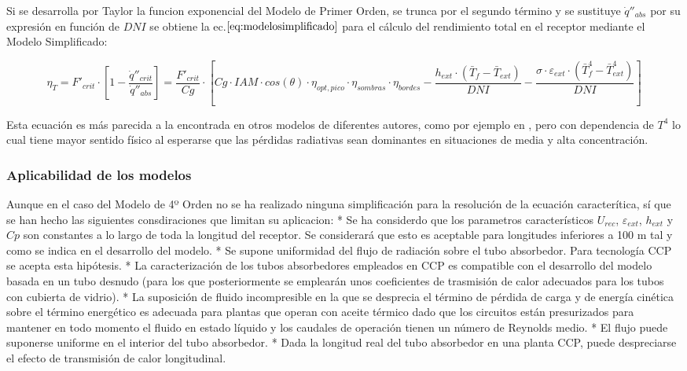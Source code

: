 Si se desarrolla por Taylor la funcion exponencial del Modelo de Primer
Orden, se trunca por el segundo término y se sustituye
\(\dot q''_{abs}\) por su expresión en función de \(DNI\) se obtiene la
ec.\(\eqref{eq:modelosimplificado}\) para el cálculo del rendimiento
total en el receptor mediante el Modelo Simplificado:

\begin{equation}
    \eta_{T} = F'_{crit} \cdot \left[1 - \frac{\dot q''_{crit}}{\dot q''_{abs}}\right] = \frac{F'_{crit}}{Cg} \cdot \left[Cg \cdot IAM \cdot cos(\theta) \cdot \eta_{opt,pico} \cdot \eta_{sombras} \cdot \eta_{bordes} - \frac{h_{ext}\cdot (\bar{T}_{f}-\bar{T}_{ext})}{DNI} - \frac{\sigma \cdot \varepsilon_{ext}\cdot(\bar{T}^{4}_{f}-\bar{T}^{4}_{ext})}{DNI}\right] 
    \label{eq:modelosimplificado}
\end{equation}

Esta ecuación es más parecida a la encontrada en otros modelos de
diferentes autores, como por ejemplo en
\cite{1022085/DVRL97SH}\cite{1022085/HI2ETXYA}, pero con dependencia de
\(T^{4}\) lo cual tiene mayor sentido físico al esperarse que las
pérdidas radiativas sean dominantes en situaciones de media y alta
concentración.

\hypertarget{aplicabilidad-de-los-modelos}{%
\subsubsection{Aplicabilidad de los
modelos}\label{aplicabilidad-de-los-modelos}}

Aunque en el caso del Modelo de 4º Orden no se ha realizado ninguna
simplificación para la resolución de la ecuación caracterítica, sí que
se han hecho las siguientes consdiraciones que limitan su aplicacion: *
Se ha considerdo que los parametros característicos \(U_{rec}\),
\(\varepsilon_{ext}\), \(h_{ext}\) y \(Cp\) son constantes a lo largo de
toda la longitud del receptor. Se considerará que esto es aceptable para
longitudes inferiores a 100 m tal y como se indica en el desarrollo del
modelo. * Se supone uniformidad del flujo de radiación sobre el tubo
absorbedor. Para tecnología CCP se acepta esta hipótesis. * La
caracterización de los tubos absorbedores empleados en CCP es compatible
con el desarrollo del modelo basada en un tubo desnudo (para los que
posteriormente se emplearán unos coeficientes de trasmisión de calor
adecuados para los tubos con cubierta de vidrio). * La suposición de
fluido incompresible en la que se desprecia el término de pérdida de
carga y de energía cinética sobre el término energético es adecuada para
plantas que operan con aceite térmico dado que los circuitos están
presurizados para mantener en todo momento el fluido en estado líquido y
los caudales de operación tienen un número de Reynolds medio. * El flujo
puede suponerse uniforme en el interior del tubo absorbedor. * Dada la
longitud real del tubo absorbedor en una planta CCP, puede despreciarse
el efecto de transmisión de calor longitudinal.

